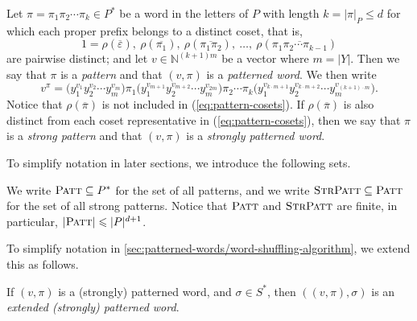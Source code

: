 \begin{definition}\label{defn:patterned-words}
	Let $\pi = \pi_1 \pi_2 \cdots \pi_k \in P^*$ be a word in the letters of $P$ with length $k = |\pi|_P \leqslant d$ for which each proper prefix belongs to a distinct coset, that is,
	\begin{equation}\label{eq:pattern-cosets}
		1 = \rho(\overline{\varepsilon}),\ 
		\rho(\overline{\pi_1}),\ 
		\rho(\overline{\pi_1\pi_2}),\ 
		\ldots,\ 
		\rho(\overline{\pi_1\pi_2\cdots\pi_{k-1}})
	\end{equation}
	are pairwise distinct; and let $v \in \mathbb{N}^{(k+1)m}$ be a vector where $m = |Y|$.
	Then we say that $\pi$ is a \emph{pattern} and that $(v,\pi)$ is a \emph{patterned word}.
	We then write
	\begin{equation*}
		v^\pi
		=
		\Big(
			y_1^{v_1}
			y_2^{v_2}
			\cdots
			y_m^{v_m}
		\Big)
		\pi_1
		\Big(
			y_1^{v_{m+1}}
			y_2^{v_{m+2}}
			\cdots
			y_m^{v_{2m}}
		\Big)
		\pi_2
		\cdots
		\pi_k
		\Big(
			y_1^{v_{k \cdot m+1}}
			y_2^{v_{k \cdot m+2}}
			\cdots
			y_m^{v_{(k+1)\cdot m}}
		\Big).
	\end{equation*}
	Notice that $\rho(\overline{\pi})$ is not included in (\ref{eq:pattern-cosets}).
	If $\rho(\overline{\pi})$ is also distinct from each coset representative in (\ref{eq:pattern-cosets}), then we say that $\pi$ is a \emph{strong pattern} and that $(v,\pi)$ is a \emph{strongly patterned word}.
\end{definition}

To simplify notation in later sections, we introduce the following sets.

\begin{definition}\label{defn:pattern-set}
	We write $\textsc{Patt} \subseteq P^*$ for the set of all patterns, and we write $\textsc{StrPatt} \subseteq \textsc{Patt}$ for the set of all strong patterns.
	Notice that $\textsc{Patt}$ and $\textsc{StrPatt}$ are finite, in particular, $|\textsc{Patt}| \leqslant |P|^{d+1}$.
\end{definition}

To simplify notation in \cref{sec:patterned-words/word-shuffling-algorithm}, we extend this as follows.

\begin{definition}\label{defn:extended-special-form}
	If $(v,\pi)$ is a (strongly) patterned word, and $\sigma \in S^*$, then $((v,\pi),\sigma)$ is an \emph{extended (strongly) patterned word}.
\end{definition}

